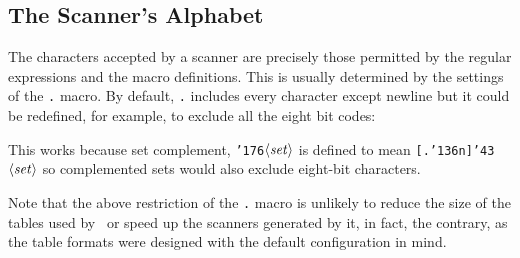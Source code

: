

\subsection{The Scanner's Alphabet}

The characters accepted by a scanner are precisely those permitted by the
regular expressions and the macro definitions.  This is usually determined by
the settings of the \mbox{\tt .} macro.  By default, \mbox{\tt .} includes every character except
newline but it could be redefined, for example, to exclude all the eight bit
codes:


This works because set complement, \mbox{\tt {\char'176}}$\langle{\it set}\rangle$ is defined to
mean \mbox{\tt [.{\char'136}n]{\char'43}}$\langle{\it set}\rangle$ so complemented sets would also exclude
eight-bit characters.

Note that the above restriction of the \mbox{\tt .} macro is unlikely to reduce the size
of the tables used by \lx\ or speed up the scanners generated by it, in fact,
the contrary, as the table formats were designed with the default configuration
in mind.


